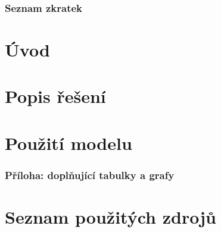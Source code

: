 \documentclass[a4paper, 11pt, twoside]{article}
\begin{document}
  \thispagestyle{empty}
  

  \newpage
  \setcounter{page}{1} %
  \tableofcontents{}


  \newpage
  \section{Seznam zkratek}%
  \begin{multicols}{2}
  
  \end{multicols}

  \listoffigures{}
  \listoftables{}


  \newpage
  \setcounter{page}{1}%
  \part{Úvod}
  
% 
% 
  \newpage
  \part{Popis řešení}\label{cast:1}
  
% 
% 

  \FloatBarrier
  \newpage
  \part{Použití modelu}\label{cast:2}
  


  \FloatBarrier
  \appendix
  \section{Příloha: doplňující tabulky a grafy}\label{sec:priloha}
  

%  


  \FloatBarrier

  \part*{Seznam použitých zdrojů}
  
  
\end{document}
